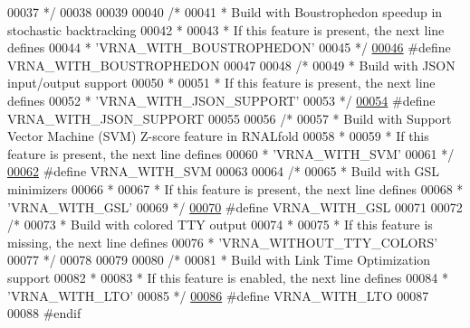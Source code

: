 \begin{DoxyCode}
00037 \textcolor{comment}{ */}
00038 
00039 
00040 \textcolor{comment}{/*}
00041 \textcolor{comment}{ * Build with Boustrophedon speedup in stochastic backtracking}
00042 \textcolor{comment}{ *}
00043 \textcolor{comment}{ * If this feature is present, the next line defines}
00044 \textcolor{comment}{ * 'VRNA\_WITH\_BOUSTROPHEDON'}
00045 \textcolor{comment}{ */}
\mbox{\hyperlink{vrna__config_8h_a6b6bc04ea9e3ea9d91052ef79c03ed86}{00046}} \textcolor{preprocessor}{#define VRNA\_WITH\_BOUSTROPHEDON}
00047 
00048 \textcolor{comment}{/*}
00049 \textcolor{comment}{ * Build with JSON input/output support}
00050 \textcolor{comment}{ *}
00051 \textcolor{comment}{ * If this feature is present, the next line defines}
00052 \textcolor{comment}{ * 'VRNA\_WITH\_JSON\_SUPPORT'}
00053 \textcolor{comment}{ */}
\mbox{\hyperlink{vrna__config_8h_a3e4e903fe0da19bc6726e048f9526ee2}{00054}} \textcolor{preprocessor}{#define VRNA\_WITH\_JSON\_SUPPORT}
00055 
00056 \textcolor{comment}{/*}
00057 \textcolor{comment}{ * Build with Support Vector Machine (SVM) Z-score feature in RNALfold}
00058 \textcolor{comment}{ *}
00059 \textcolor{comment}{ * If this feature is present, the next line defines}
00060 \textcolor{comment}{ * 'VRNA\_WITH\_SVM'}
00061 \textcolor{comment}{ */}
\mbox{\hyperlink{vrna__config_8h_ac3a61d09d5a5dc150b259bbf36786a7c}{00062}} \textcolor{preprocessor}{#define VRNA\_WITH\_SVM}
00063 
00064 \textcolor{comment}{/*}
00065 \textcolor{comment}{ * Build with GSL minimizers}
00066 \textcolor{comment}{ *}
00067 \textcolor{comment}{ * If this feature is present, the next line defines}
00068 \textcolor{comment}{ * 'VRNA\_WITH\_GSL'}
00069 \textcolor{comment}{ */}
\mbox{\hyperlink{vrna__config_8h_a493b463513a86c5b4d055c5e0188e0de}{00070}} \textcolor{preprocessor}{#define VRNA\_WITH\_GSL}
00071 
00072 \textcolor{comment}{/*}
00073 \textcolor{comment}{ * Build with colored TTY output}
00074 \textcolor{comment}{ *}
00075 \textcolor{comment}{ * If this feature is missing, the next line defines}
00076 \textcolor{comment}{ * 'VRNA\_WITHOUT\_TTY\_COLORS'}
00077 \textcolor{comment}{ */}
00078 
00079 
00080 \textcolor{comment}{/*}
00081 \textcolor{comment}{ * Build with Link Time Optimization support}
00082 \textcolor{comment}{ *}
00083 \textcolor{comment}{ * If this feature is enabled, the next line defines}
00084 \textcolor{comment}{ * 'VRNA\_WITH\_LTO'}
00085 \textcolor{comment}{ */}
\mbox{\hyperlink{vrna__config_8h_ae094d9cad6dff9728301bf772e8a26c5}{00086}} \textcolor{preprocessor}{#define VRNA\_WITH\_LTO}
00087 
00088 \textcolor{preprocessor}{#endif}
\end{DoxyCode}

